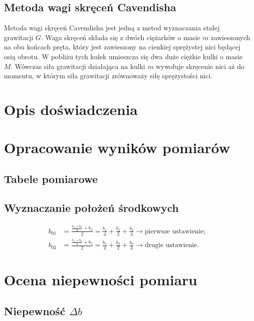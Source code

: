\documentclass[a4paper,12pt]{article}
\begin{document}
\subsection*{Metoda wagi skręceń Cavendisha}

Metoda wagi skręceń Cavendisha jest jedną z metod wyznaczania stałej grawitacji $G$. Waga skręceń składa się z dwóch ciężarków o masie $m$ zawieszonych na obu końcach pręta, który jest zawieszony na cienkiej sprężystej nici będącej osią obrotu. W pobliżu tych kulek umieszcza się dwa duże ciężkie kulki o masie $M$. Wówczas siła grawitacji działająca na kulki $m$ wywołuje skręcenie nici aż do momentu, w którym siła grawitacji zrównoważy siłę sprężystości nici.


\section{Opis doświadczenia}

\section{Opracowanie wyników pomiarów}

\subsection{Tabele pomiarowe}

\subsection{Wyznaczanie położeń środkowych}

\begin{align*}
    b_{01} & = \frac{\frac{b_1+b_3}{2}+b_2}{2} = \frac{b_1}{4} + \frac{b_2}{2} + \frac{b_3}{4} \rightarrow \text{pierwsze ustawienie}; \\
    b_{02} & = \frac{\frac{b_1+b_3}{2}+b_2}{2} = \frac{b_1}{4} + \frac{b_2}{2} + \frac{b_3}{4} \rightarrow \text{drugie ustawienie}.
\end{align*}

\section{Ocena niepewności pomiaru}

\subsection{Niepewność $\Delta b$}
\end{document}
